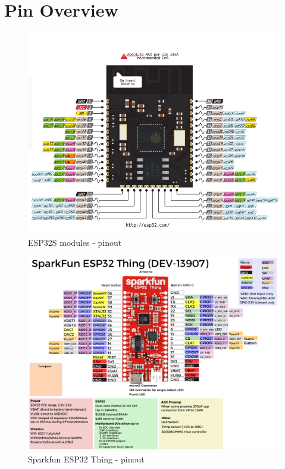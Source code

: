 \documentclass[]{scrreprt}%
\begin{document}
\chapter{Pin Overview}
\begin{center}

\begin{figure}[htb]
  \centering
  \includegraphics[width=160mm]{img/esp32.png}
  \caption{ESP32S modules - pinout}
\end{figure}

\begin{figure}[htb]
  \centering
  \includegraphics[width=160mm]{img/esp32_sparkfun.png}
  \caption{Sparkfun ESP32 Thing - pinout}
\end{figure}

\end{center}
\end{document}
